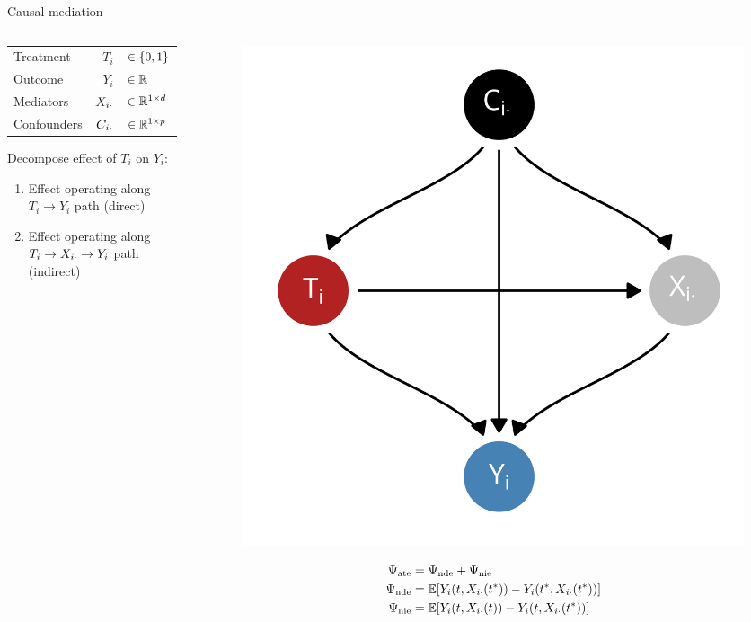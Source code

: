 \documentclass[aspectratio=169]{beamer}
\theoremstyle{remark}
\begin{document}
\begin{frame}{Causal mediation}
    \begin{columns}
        \begin{column}{0.5\textwidth}
            \begin{table}[]
                \begin{tabular}{lrl}
                    Treatment   & $T_i$          & $\in \{0, 1\} $     \\
                    Outcome     & $Y_i$          & $\in \mathbb{R}$              \\
                    Mediators   & $X_{i \cdot}$ & $\in \mathbb{R}^{1 \times d}$ \\
                    Confounders & $C_{i \cdot}$ & $\in \mathbb{R}^{1 \times p}$
                \end{tabular}
            \end{table}
            Decompose effect of $T_i$ on $Y_i$:
            \begin{enumerate}
                \item Effect operating along $T_i \to Y_i$ path (direct)
                \item Effect operating along $T_i \to X_{i \cdot} \to Y_i$ path (indirect)
            \end{enumerate}
        \end{column}
        \begin{column}{0.5\textwidth}
            \centering
            \begin{figure}[ht]
                \includegraphics[width=.7\textwidth]{figures/dags/mediating.png}
            \end{figure}
            \vspace{-7mm}
            \begin{align*}
                \ate & = \nde + \nie                                                    \\
                \nde & = \E{Y_i (t, \X_{i \cdot}(t^*)) - Y_i (t^*, \X_{i \cdot} (t^*))} \\
                \nie & = \E{Y_i (t, \X_{i \cdot}(t)) - Y_i (t, \X_{i \cdot} (t^*))}
            \end{align*}
        \end{column}
    \end{columns}
\end{frame}
\end{document}
